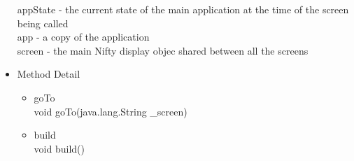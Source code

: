 \documentclass[letterpaper]{article}
\begin{document}
\begin{itemize}
										appState - the current state of the main application at the time of the screen being called \\
										app - a copy of the application \\
										screen - the main Nifty display objec shared between all the screens \\
								\item	Method Detail
										\begin{itemize}
											\item	goTo \\
													void goTo(java.lang.String \_screen)
											\item	build \\
													void build()
										\end{itemize}
							\end{itemize}
							
\end{document}
